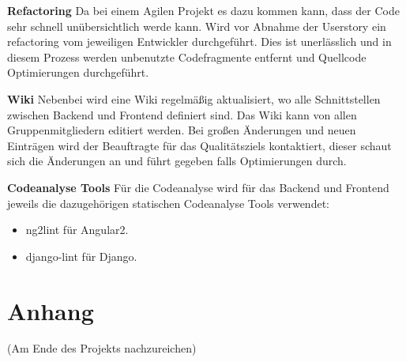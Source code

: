 \documentclass[accentcolor=tud0b,12pt,paper=a4]{tudreport}
\begin{document}
\textbf{Refactoring}
Da bei einem Agilen Projekt es dazu kommen kann, dass der Code sehr schnell unübersichtlich werde kann. Wird vor Abnahme der Userstory ein refactoring vom jeweiligen Entwickler durchgeführt. Dies ist unerlässlich und in diesem Prozess werden unbenutzte Codefragmente entfernt und Quellcode Optimierungen durchgeführt.

\textbf{Wiki}
Nebenbei wird eine Wiki regelmäßig aktualisiert, wo alle Schnittstellen zwischen Backend und Frontend definiert sind. Das Wiki kann von allen Gruppenmitgliedern editiert werden. Bei großen Änderungen und neuen Einträgen wird der Beauftragte für das Qualitätsziels kontaktiert, dieser schaut sich die Änderungen an und führt gegeben falls Optimierungen durch.

\textbf{Codeanalyse Tools}
Für die Codeanalyse wird für das Backend und Frontend jeweils die dazugehörigen statischen Codeanalyse Tools verwendet:
\begin{itemize}
	\item ng2lint für Angular2.
	\item django-lint für Django.
\end{itemize}
	




\appendix
	\chapter{Anhang}
		(Am Ende des Projekts nachzureichen)\\
\end{document}
